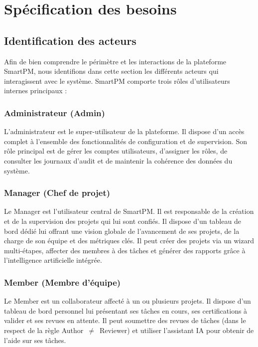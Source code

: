\section{Spécification des besoins}
\label{sec:besoins}

\subsection{Identification des acteurs}

Afin de bien comprendre le périmètre et les interactions de la plateforme SmartPM, nous
identifions dans cette section les différents acteurs qui interagissent avec le système.
SmartPM comporte trois rôles d'utilisateurs internes principaux :

\subsubsection{Administrateur (Admin)}

L'administrateur est le super-utilisateur de la plateforme. Il dispose d'un accès complet
à l'ensemble des fonctionnalités de configuration et de supervision. Son rôle principal est
de gérer les comptes utilisateurs, d'assigner les rôles, de consulter les journaux d'audit
et de maintenir la cohérence des données du système.

\subsubsection{Manager (Chef de projet)}

Le Manager est l'utilisateur central de SmartPM. Il est responsable de la création et de
la supervision des projets qui lui sont confiés. Il dispose d'un tableau de bord dédié lui
offrant une vision globale de l'avancement de ses projets, de la charge de son équipe et des
métriques clés. Il peut créer des projets via un wizard multi-étapes, affecter des membres
à des tâches et générer des rapports grâce à l'intelligence artificielle intégrée.

\subsubsection{Member (Membre d'équipe)}

Le Member est un collaborateur affecté à un ou plusieurs projets. Il dispose d'un tableau
de bord personnel lui présentant ses tâches en cours, ses certifications à valider et ses
revues en attente. Il peut soumettre des revues de tâches (dans le respect de la règle
Author~$\neq$~Reviewer) et utiliser l'assistant IA pour obtenir de l'aide sur ses tâches.

